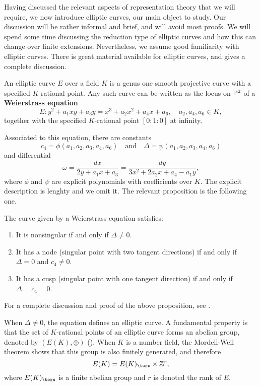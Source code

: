 
Having discussed the relevant aspects of representation theory that we will require, we now introduce elliptic curves, our main object to study. Our discussion will be rather informal and brief, and will avoid most proofs. We will spend some time discussing the reduction type of elliptic curves and how this can change over finite extensions. Nevertheless, we assume good familiarity with elliptic curves. There is great material available for elliptic curves, and \cite{S1} gives a complete discussion.

An elliptic curve $E$ over a field $K$ is a genus one smooth projective curve with a specified $K$-rational point. Any such curve can be written as the locus on $\mathbb{P}^2$ of a \textbf{Weierstrass equation}
\begin{equation}\label{eqn_gen_elliptic}
    E: y^2+a_1xy+a_3y=x^3+a_2x^2+a_4x+a_6,\quad a_2,a_4,a_6\in K,
\end{equation}
together with the specified $K$-rational point $[0:1:0]$ at infinity.

Associated to this equation, there are constants 
$$c_4=\phi(a_1,a_2,a_3,a_4,a_6)\quad\text{and}\quad \Delta=\psi(a_1,a_2,a_3,a_4,a_6)$$
and differential
$$\omega=\frac{dx}{2y+a_1x+a_3}=\frac{dy}{3x^2+2a_2x+a_4-a_1y},$$
where $\phi$ and $\psi$ are explicit polynomials with coefficients over $K$. The explicit description is lenghty and we omit it. The relevant proposition is the following one.

\begin{prop}\label{prop_nodecusp}
    The curve given by a Weierstrass equation satisfies:
    \begin{enumerate}
        \item It is nonsingular if and only if $\Delta\neq0$.
        \item It has a node (singular point with two tangent directions) if and only if $\Delta=0$ and $c_4 \neq 0$.
        \item It has a cusp (singular point with one tangent direction) if and only if $\Delta= c_4 = 0$. 
    \end{enumerate}
\end{prop}
For a complete discussion and proof of the above proposition, see \cite[\S III.1]{S1}.

When $\Delta\neq0$, the equation defines an elliptic curve. A fundamental property is that the set of $K$-rational points of an elliptic curve forms an abelian group, denoted by $(E(K),\oplus)$ (\cite[\S III.2]{S1}). When $K$ is a number field, the Mordell-Weil theorem shows that this group is also finitely generated, and therefore 
$$E(K)=E(K)_{\tors}\times\ZZ^r,$$
where $E(K)_{\tors}$ is a finite abelian group and $r$ is denoted the rank of $E$.
